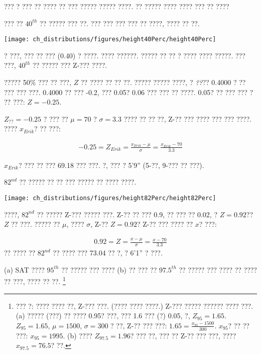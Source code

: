 ??? ? ??? ?? ???? ?? ??? ????? ????? ????. ?? ????? ???? ???? ??? ?? ????

\begin{example}{??? ?? $40^{th}$ ?? ????? ??? ??. ??? ??? ??? ???}\label{normalExam40Perc}
?? ????, ???? ?? ??.\vspace{-1mm}
\begin{center}
\texttt{[image: ch\_distributions/figures/height40Perc/height40Perc]}\vspace{-1mm}
\end{center}
? ???, ??? ?? ??? (0.40) ? ????. ???? ??????. ????? ?? ?? ? ???? ???? ?????. ??? ???, $40^{th}$ ?? ????? ??? Z-??? ????.

????? 50\% ??? ?? ???, $Z$ ?? ???? ?? ?? ??. ????? ????? ????, ? \emph{??}?? 0.4000 ? ?? ??? ??? ???. 0.4000 ?? ??? -0.2, ??? 0.05? 0.06 ??? ??? ?? ????. 0.05? ?? ??? ??? ? ?? ???: $Z=-0.25$.

$Z_{??}=-0.25$ ? ??? ?? $\mu=70$ ? $\sigma=3.3$ ???? ?? ?? ??, Z-?? ??? ???? ??? ??? ????. ???? $x_{Erik}$? ?? ???:

\begin{eqnarray*}
-0.25 = Z_{Erik} = \frac{x_{Erik} - \mu}{\sigma} = \frac{x_{Erik} - 70}{3.3}
\end{eqnarray*}

$x_{Erik}$? ??? ?? ??? 69.18 ??? ???. ?, ??? ? 5'9'' (5-??, 9-??? ?? ???).
\end{example}

\begin{example}{$82^{nd}$ ?? ????? ?? ?? ??? ?????}
?? ???? ????. \textC{\vspace{-3mm}}
\begin{center}
\texttt{[image: ch\_distributions/figures/height82Perc/height82Perc]}\textC{\vspace{-1mm}}
\end{center}
????, $82^{nd}$ ?? ????? Z-??? ????? ???. Z-?? ?? ??? 0.9, ?? ??? ?? 0.02, ? $Z=0.92$?? $Z$ ?? ???. ????? ?? $\mu$, ???? $\sigma$, Z-?? $Z=0.92$? Z-?? ??? ???? ?? $x$? ???:

\begin{eqnarray*}
0.92 = Z = \frac{x-\mu}{\sigma} = \frac{x - 70}{3.3}
\end{eqnarray*}
?? ???? ?? $82^{nd}$ ?? ???? ??? 73.04 ?? ?, ? 6'1'' ? ???.
\end{example}

\begin{exercise}
(a) SAT ???? $95^{th}$ ?? ????? ??? ???? (b) ?? ??? ?? $97.5^{th}$ ?? ????? ??? ???? ?? ???? ?? ???, ???? ?? ??. \footnote{??? ?: ???? ???? ??, Z-??? ???. (???? ???? ????.) Z-??? ????? ?????? ???? ???. (a) ????? (???) ?? ???? 0.95? ???, ??? 1.6 ??? (?) 0.05, ?, $Z_{95}=1.65$. $Z_{95}=1.65$, $\mu = 1500$, $\sigma = 300$ ? ??, Z-?? ??? ???: $1.65 = \frac{x_{95} - 1500}{300}$. $x_{95}$? ?? ?? ???: $x_{95} = 1995$. (b) ???? $Z_{97.5} = 1.96$? ??? ??, ??? ?? Z-?? ??? ???, ???? $x_{97.5} = 76.5$? ??.}
\end{exercise}

